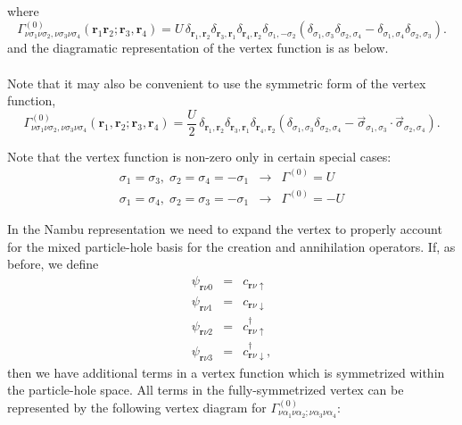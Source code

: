 where
\begin{equation}
 \Gamma^{(0)}_{\nu\sigma_1\nu\sigma_2,\nu\sigma_3\nu\sigma_4}(\mathbf{r}_1 \mathbf{r}_2; 
\mathbf{r}_3, \mathbf{r}_4)
 = U\, \delta_{\mathbf{r}_1,\mathbf{r}_2} \delta_{\mathbf{r}_3,\mathbf{r}_1} 
\delta_{\mathbf{r}_4,\mathbf{r}_2}
\delta_{\sigma_1,-\sigma_2}
\left(\delta_{\sigma_1,\sigma_3} \delta_{\sigma_2,\sigma_4}
 - \delta_{\sigma_1,\sigma_4} \delta_{\sigma_2,\sigma_3}\right).
\end{equation}
and the diagramatic representation of
the vertex function is as below.\\
\\
Note that it may also be convenient to use the symmetric form
of the vertex function,
\begin{equation}
\Gamma^{(0)}_{\nu\sigma_1\nu\sigma_2,\nu\sigma_3\nu\sigma_4}(\mathbf{r}_1, \mathbf{r}_2; 
\mathbf{r}_3, \mathbf{r}_4)
 = \frac{U}{2}\, \delta_{\mathbf{r}_1,\mathbf{r}_2} 
\delta_{\mathbf{r}_3,\mathbf{r}_1} \delta_{\mathbf{r}_4,\mathbf{r}_2}
\left( \delta_{\sigma_1,\sigma_3}\delta_{\sigma_2,\sigma_4}
 - \vec{\sigma}_{\sigma_1,\sigma_3}\cdot
 \vec{\sigma}_{\sigma_2,\sigma_4} \right).
\end{equation}

Note that the vertex function is non-zero only in 
certain special cases:
\begin{eqnarray}
\sigma_1 = \sigma_3,\;\sigma_2 = \sigma_4 = -\sigma_1 & \to &
\Gamma^{(0)} = U \\
\sigma_1 = \sigma_4, \;\sigma_2 = \sigma_3 = -\sigma_1 & \to &
\Gamma^{(0)} = -U
\end{eqnarray}

In the Nambu representation we need to expand the vertex
to properly account for the mixed particle-hole basis
for the creation and annihilation operators.  If,
as before, we define
\begin{eqnarray}
\psi_{\mathbf{r}\nu 0} & = & c_{\mathbf{r}\nu\uparrow} \\   
\psi_{\mathbf{r}\nu 1} & = & c_{\mathbf{r}\nu\downarrow} \\
\psi_{\mathbf{r}\nu 2} & = & c^{\dagger}_{\mathbf{r}\nu\uparrow} \\
\psi_{\mathbf{r}\nu 3} & = & c^{\dagger}_{\mathbf{r}\nu\downarrow},
\end{eqnarray}
then we have additional terms in a vertex function
which is symmetrized within the particle-hole space.
All terms in the fully-symmetrized vertex can be represented
by the following vertex diagram for 
$\Gamma^{(0)}_{\nu\alpha_1\nu\alpha_2;\nu\alpha_3\nu\alpha_4}:$ \\
\\

